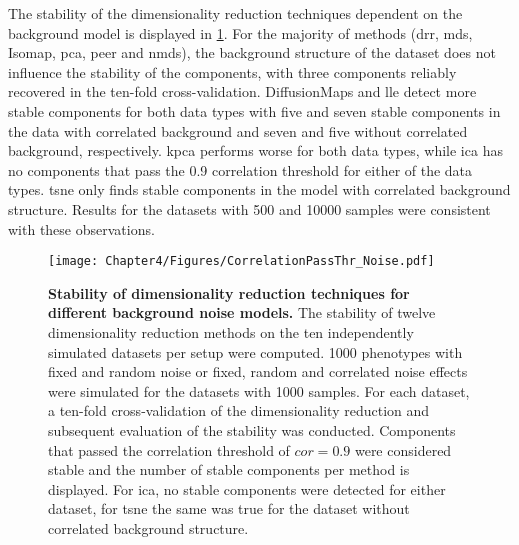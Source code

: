 The stability of the dimensionality reduction techniques dependent on the background model is displayed in \cref{fig:cor-noise}. For the majority of methods (\gls{drr}, \gls{mds}, Isomap, \gls{pca}, \gls{peer} and \gls{nmds}), the background structure of the dataset does not influence the stability of the components, with three components reliably recovered in the ten-fold cross-validation. DiffusionMaps and \gls{lle} detect more stable components for both data types with five and seven stable components in the data with correlated background and seven and five without correlated background, respectively. \gls{kpca} performs worse for both data types, while \gls{ica} has no components that pass the \num{0.9} correlation threshold for either of the data types. \gls{tsne} only finds stable components in the model with correlated background structure.  Results for the datasets with \num{500} and \num{10000} samples were consistent with these observations.

\begin{figure}[hbtp]
	\centering
	\texttt{[image: Chapter4/Figures/CorrelationPassThr\_Noise.pdf]}
	\caption[\textbf{Stability of dimensionality reduction techniques for different background noise models.}]{\textbf{Stability of dimensionality reduction techniques for different background noise models. }The stability of twelve dimensionality reduction methods on the ten independently simulated datasets per setup were computed. \num{1000} phenotypes with fixed and random noise or fixed, random and correlated noise effects were simulated for the datasets with \numlist{1000} samples. For each dataset, a ten-fold cross-validation of the dimensionality reduction and subsequent evaluation of the stability was conducted. Components that passed the correlation threshold of \(cor=0.9\) were considered stable and the number of stable components per method is displayed. For \gls{ica}, no stable components were detected for either dataset, for \gls{tsne} the same was true for the dataset without correlated background structure.} 
	 	\label{fig:cor-noise}
\end{figure}

